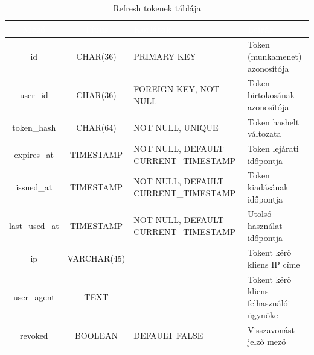 \documentclass[12pt]{report}
\begin{document}
\begin{table}[h!]
    \centering
    \renewcommand{\arraystretch}{1.5}  %
    \begin{tabularx}{\textwidth}{|c|c|>{\raggedright\arraybackslash}X|>{\raggedright\arraybackslash}X|}  %
        \hline
        \rowcolor{gray!30} \textcolor{white}{\textbf{Mező}} & \textcolor{white}{\textbf{Típus}} & \textcolor{white}{\textbf{Korlátok}} & \textcolor{white}{\textbf{Leírás}} \\
        \hline
        id & CHAR(36) & PRIMARY KEY & Token (munkamenet) azonosítója \\
        \hline
        user\_id & CHAR(36) & FOREIGN KEY, NOT NULL & Token birtokosának azonosítója \\
        \hline
        token\_hash & CHAR(64) & NOT NULL, UNIQUE & Token hashelt változata \\
        \hline
        expires\_at & TIMESTAMP & NOT NULL, DEFAULT CURRENT\_TIMESTAMP & Token lejárati időpontja \\
        \hline
        issued\_at & TIMESTAMP & NOT NULL, DEFAULT CURRENT\_TIMESTAMP & Token kiadásának időpontja \\
        \hline
        last\_used\_at & TIMESTAMP & NOT NULL, DEFAULT CURRENT\_TIMESTAMP & Utolsó használat időpontja \\
        \hline
        ip & VARCHAR(45) &  & Tokent kérő kliens IP címe \\
        \hline
        user\_agent & TEXT & & Tokent kérő kliens felhasználói ügynöke \\
        \hline
        revoked & BOOLEAN & DEFAULT FALSE & Visszavonást jelző mező \\
        \hline
    \end{tabularx}
    \caption{Refresh tokenek táblája}
    \label{tab:refresh_tokens}
\end{table}
\end{document}
